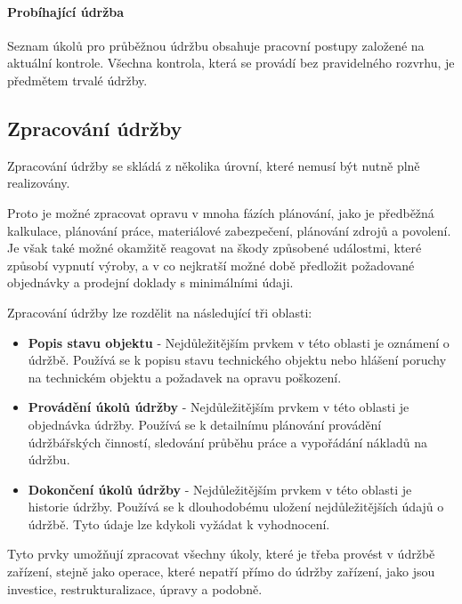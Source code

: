\documentclass[thesis=M,czech]{FITthesis}[2012/06/26]
\begin{document}
\paragraph{Probíhající údržba}
Seznam úkolů pro průběžnou údržbu obsahuje pracovní postupy založené na aktuální kontrole. Všechna kontrola, která se provádí bez pravidelného rozvrhu, je předmětem trvalé údržby.

\subsection{Zpracování údržby}
Zpracování údržby se skládá z několika úrovní, které nemusí být nutně plně realizovány.

Proto je možné zpracovat opravu v mnoha fázích plánování, jako je předběžná kalkulace, plánování práce, materiálové zabezpečení, plánování zdrojů a povolení. Je však také možné okamžitě reagovat na škody způsobené událostmi, které způsobí vypnutí výroby, a v co nejkratší možné době předložit požadované objednávky a prodejní doklady s minimálními údaji.

Zpracování údržby lze rozdělit na následující tři oblasti:
\begin{itemize}
	\item
	\textbf{Popis stavu objektu} - Nejdůležitějším prvkem v této oblasti je oznámení o údržbě. Používá se k popisu stavu technického objektu nebo hlášení poruchy na technickém objektu a požadavek na opravu poškození.
	\item
	\textbf{Provádění úkolů údržby} - Nejdůležitějším prvkem v této oblasti je objednávka údržby. Používá se k detailnímu plánování provádění údržbářských činností, sledování průběhu práce a vypořádání nákladů na údržbu.
	\item
	\textbf{Dokončení úkolů údržby} - Nejdůležitějším prvkem v této oblasti je historie údržby. Používá se k dlouhodobému uložení nejdůležitějších údajů o údržbě. Tyto údaje lze kdykoli vyžádat k vyhodnocení.
\end{itemize} 

Tyto prvky umožňují zpracovat všechny úkoly, které je třeba provést v údržbě zařízení, stejně jako operace, které nepatří přímo do údržby zařízení, jako jsou investice, restrukturalizace, úpravy a podobně.
\end{document}
